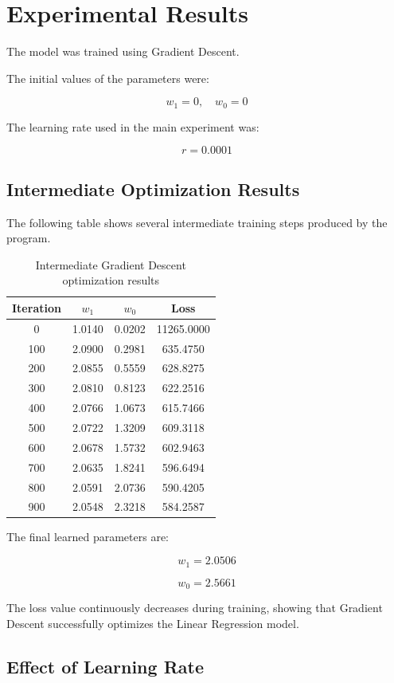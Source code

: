 \documentclass[12pt]{article}
\begin{document}
\section{Experimental Results}

The model was trained using Gradient Descent.

The initial values of the parameters were:

\[
w_1 = 0,\quad w_0 = 0
\]

The learning rate used in the main experiment was:

\[
r = 0.0001
\]

\subsection{Intermediate Optimization Results}

The following table shows several intermediate training steps produced by the program.

\begin{table}[h]
\centering
\begin{tabular}{cccc}
\toprule
Iteration & \(w_1\) & \(w_0\) & Loss \\
\midrule
0 & 1.0140 & 0.0202 & 11265.0000 \\
100 & 2.0900 & 0.2981 & 635.4750 \\
200 & 2.0855 & 0.5559 & 628.8275 \\
300 & 2.0810 & 0.8123 & 622.2516 \\
400 & 2.0766 & 1.0673 & 615.7466 \\
500 & 2.0722 & 1.3209 & 609.3118 \\
600 & 2.0678 & 1.5732 & 602.9463 \\
700 & 2.0635 & 1.8241 & 596.6494 \\
800 & 2.0591 & 2.0736 & 590.4205 \\
900 & 2.0548 & 2.3218 & 584.2587 \\
\bottomrule
\end{tabular}
\caption{Intermediate Gradient Descent optimization results}
\end{table}

The final learned parameters are:

\[
w_1 = 2.0506
\]

\[
w_0 = 2.5661
\]

The loss value continuously decreases during training, showing that Gradient Descent successfully optimizes the Linear Regression model.

\subsection{Effect of Learning Rate}
\end{document}
